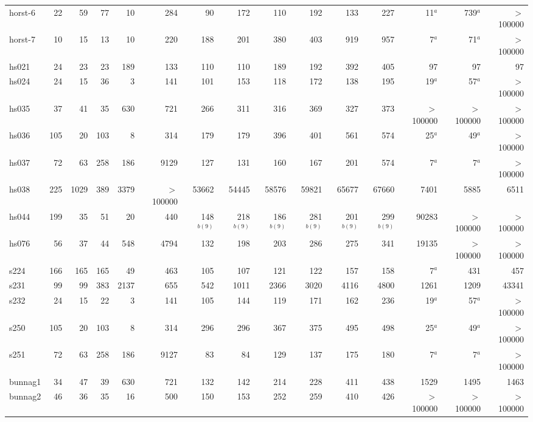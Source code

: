 \begin{landscape}
\begin{table}[htbp]
\begin{tabular}{lrrrrrrrrrrrrrr}
horst-6  & 22 & 59 & 77 & 10 & 284 & 90 & 172 & 110 & 192 & 133 & 227 & 11$^a$ & 739$^a$ & $>$100000 \\[0.05cm]
horst-7  & 10 & 15 & 13 & 10 & 220 & 188 & 201 & 380 & 403 & 919 & 957 & 7$^a$ & 71$^a$ & $>$100000 \\[0.05cm]
hs021  & 24 & 23 & 23 & 189 & 133 & 110 & 110 & 189 & 192 & 392 & 405 & 97 & 97 & 97 \\[0.05cm]
hs024  & 24 & 15 & 36 & 3 & 141 & 101 & 153 & 118 & 172 & 138 & 195 & 19$^a$ & 57$^a$ & $>$100000 \\[0.05cm]
hs035  & 37 & 41 & 35 & 630 & 721 & 266 & 311 & 316 & 369 & 327 & 373 & $>$100000 & $>$100000 & $>$100000 \\[0.05cm]
hs036  & 105 & 20 & 103 & 8 & 314 & 179 & 179 & 396 & 401 & 561 & 574 & 25$^a$ & 49$^a$ & $>$100000 \\[0.05cm]
hs037  & 72 & 63 & 258 & 186 & 9129 & 127 & 131 & 160 & 167 & 201 & 574 & 7$^a$ & 7$^a$ & $>$100000 \\[0.05cm]
hs038  & 225 & 1029 & 389 & 3379 & $>$100000 & 53662 & 54445 & 58576 & 59821 & 65677 & 67660 & 7401 & 5885 & 6511 \\[0.05cm]
hs044  & 199 & 35 & 51 & 20 & 440 & 148$^{b(9)}$ & 218$^{b(9)}$ & 186$^{b(9)}$ & 281$^{b(9)}$ & 201$^{b(9)}$ & 299$^{b(9)}$ & 90283 & $>$100000 & $>$100000 \\[0.05cm]
hs076  & 56 & 37 & 44 & 548 & 4794 & 132 & 198 & 203 & 286 & 275 & 341 & 19135 & $>$100000 & $>$100000 \\[0.05cm]
s224  & 166 & 165 & 165 & 49 & 463 & 105 & 107 & 121 & 122 & 157 & 158 & 7$^a$ & 431 & 457 \\[0.05cm]
s231  & 99 & 99 & 383 & 2137 & 655 & 542 & 1011 & 2366 & 3020 & 4116 & 4800 & 1261 & 1209 & 43341 \\[0.05cm]
s232 & 24 & 15 & 22 & 3 & 141 & 105 & 144 & 119 & 171 & 162 & 236 & 19$^a$ & 57$^a$ & $>$100000 \\[0.05cm]
s250 & 105 & 20  & 103 & 8 & 314 & 296 & 296 & 367 & 375 & 495 & 498 & 25$^a$ & 49$^a$ & $>$100000 \\[0.05cm]
s251 & 72 & 63 & 258 & 186 & 9127 & 83 & 84 & 129 & 137 & 175 & 180 & 7$^a$ & 7$^a$ & $>$100000 \\[0.05cm]
bunnag1  & 34 & 47 & 39 & 630 & 721 & 132 & 142 & 214 & 228 & 411 & 438 & 1529 & 1495 & 1463 \\[0.05cm]
bunnag2  & 46 & 36 & 35 & 16 & 500 & 150 & 153 & 252 & 259 & 410 & 426 & $>$100000 & $>$100000 & $>$100000 \\[0.05cm]

\end{tabular}
\end{table}
\end{landscape}
